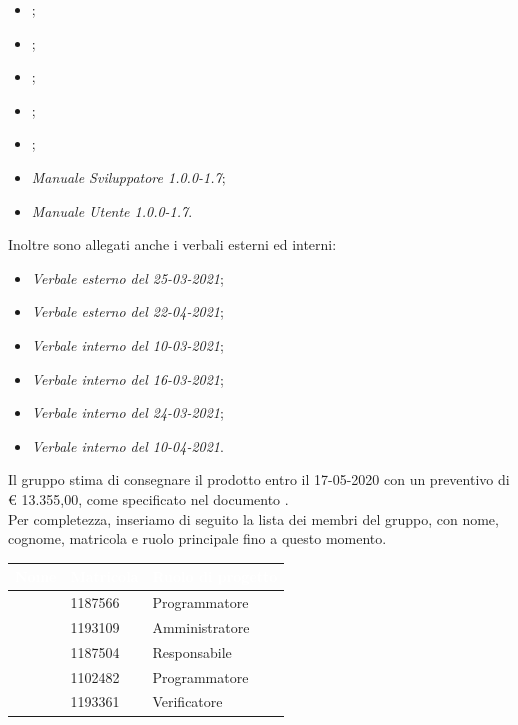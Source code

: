 \documentclass[11pt]{letter}
\begin{document}
\begin{letter}
\begin{itemize}
        	\item {};
            \item {};
            \item {};
            \item {};
            \item {};
            \item \textit{Manuale Sviluppatore 1.0.0-1.7};
            \item \textit{Manuale Utente 1.0.0-1.7}.
        \end{itemize}
        Inoltre sono allegati anche i verbali esterni ed interni:
        \begin{itemize}
            \item \textit{Verbale esterno del 25-03-2021};
            \item \textit{Verbale esterno del 22-04-2021};
            \item \textit{Verbale interno del 10-03-2021};
            \item \textit{Verbale interno del 16-03-2021};
            \item \textit{Verbale interno del 24-03-2021};
            \item \textit{Verbale interno del 10-04-2021}.
        \end{itemize}
        Il gruppo stima di consegnare il prodotto entro il 17-05-2020 con un preventivo di \euro{} 13.355,00, come specificato nel documento .\\
        Per completezza, inseriamo di seguito la lista dei membri del gruppo, con nome, cognome, matricola e ruolo principale fino a questo momento.
        {
            \renewcommand{\arraystretch}{2}
            \begin{longtable}{ C{4cm} C{4cm} C{4cm}}
                \textcolor{white}{\textbf{Nome}} & \textcolor{white}{\textbf{Matricola}} & \textcolor{white}{\textbf{Ruolo di progetto}}\\
                \endhead 
                \SG{} & 1187566 & Programmatore\\
                \BM{} & 1193109 & Amministratore\\
                \RA{} & 1187504 & Responsabile\\
                \SH{} & 1102482 & Programmatore\\
                \PA{} & 1193361 & Verificatore\\

\end{longtable}}
\end{letter}
\end{document}

